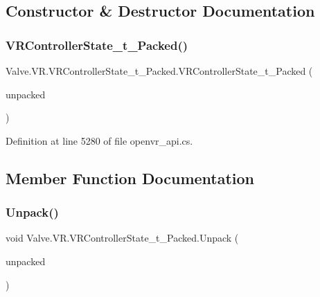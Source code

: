 \subsection{Constructor \& Destructor Documentation}
\mbox{\label{struct_valve_1_1_v_r_1_1_v_r_controller_state__t___packed_a06b33d7562d20c8d91ef154d3000a718}} 
\subsubsection{\texorpdfstring{VRControllerState\_t\_Packed()}{VRControllerState\_t\_Packed()}}
{\footnotesize\ttfamily Valve.\+V\+R.\+V\+R\+Controller\+State\+\_\+t\+\_\+\+Packed.\+V\+R\+Controller\+State\+\_\+t\+\_\+\+Packed (\begin{DoxyParamCaption}\item[{\mbox{\hyperlink{struct_valve_1_1_v_r_1_1_v_r_controller_state__t}{V\+R\+Controller\+State\+\_\+t}}}]{unpacked }\end{DoxyParamCaption})}



Definition at line 5280 of file openvr\+\_\+api.\+cs.



\subsection{Member Function Documentation}
\mbox{\label{struct_valve_1_1_v_r_1_1_v_r_controller_state__t___packed_af12bf87702b21add936a2214c63b0968}} 
\subsubsection{\texorpdfstring{Unpack()}{Unpack()}}
{\footnotesize\ttfamily void Valve.\+V\+R.\+V\+R\+Controller\+State\+\_\+t\+\_\+\+Packed.\+Unpack (\begin{DoxyParamCaption}\item[{ref \mbox{\hyperlink{struct_valve_1_1_v_r_1_1_v_r_controller_state__t}{V\+R\+Controller\+State\+\_\+t}}}]{unpacked }\end{DoxyParamCaption})}



